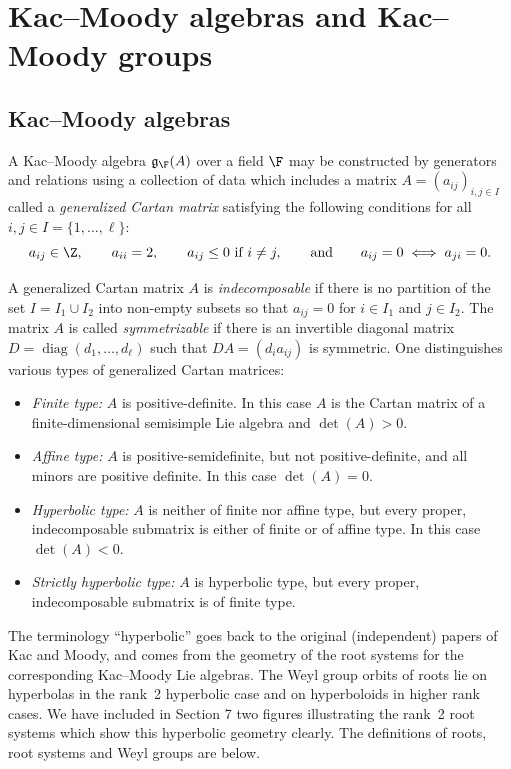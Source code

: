 \section{Kac--Moody algebras and Kac--Moody groups}

\subsection{Kac--Moody algebras}\label{subsection:Kac--Moody-algebra}

\noindent A Kac--Moody algebra $\mathfrak{g}_{\F}(A)$ over a field $\F$ may be constructed by generators and relations using a collection of data which includes a matrix $A=(a_{ij})_{i,j\in I}$ called a {\it generalized Cartan matrix} satisfying the following conditions for all $i,j\in I=\{1,\dots ,\ell\}$:
\[a_{ij}\in{\Z}, \qquad a_{ii}=2, \qquad a_{ij}\leq 0 \ \text{if} \ i\neq j, \qquad\text{and}\qquad a_{ij}=0 \iff a_{ji}=0. \]

A generalized Cartan matrix $A$ is {\it indecomposable} if there is no partition of the set $I = I_1\cup I_2$ into non-empty subsets
so that $a_{ij}=0$ for $i\in I_1$ and $j\in I_2$. The matrix $A$ is called {\it symmetrizable} if there is an invertible diagonal matrix
$D = \operatorname{diag}(d_1,\dots,d_\ell)$ such that $DA=(d_i a_{ij})$ is symmetric. One distinguishes various types of generalized Cartan matrices:
\begin{itemize}\itemsep=0pt
 \item[--] {\it Finite type:} $A$ is positive-definite. In this case $A$ is the Cartan matrix of a finite-dimensional semisimple Lie algebra and $\det(A)>0$.
 \item[--] {\it Affine type:} $A$ is positive-semidefinite, but not positive-definite, and all minors are positive definite. In this case $\det(A)=0$.
 \item[--] {\it Hyperbolic type:} $A$ is neither of finite nor affine type, but every proper, indecomposable submatrix is either of finite or of affine type. In this case $\det(A)<0$.
 \item[--] {\it Strictly hyperbolic type:} $A$ is hyperbolic type, but every proper, indecomposable submatrix is of finite type.
\end{itemize}

The terminology ``hyperbolic'' goes back to the original (independent) papers of Kac and Moody, and comes from the
geometry of the root systems for the corresponding Kac--Moody Lie algebras. The Weyl group orbits of roots lie on hyperbolas in the
rank~2 hyperbolic case and on hyperboloids in higher rank cases. We have included in Section 7 two figures illustrating the rank~2 root
systems which show this hyperbolic geometry clearly. The definitions of roots, root systems and Weyl groups are below.

